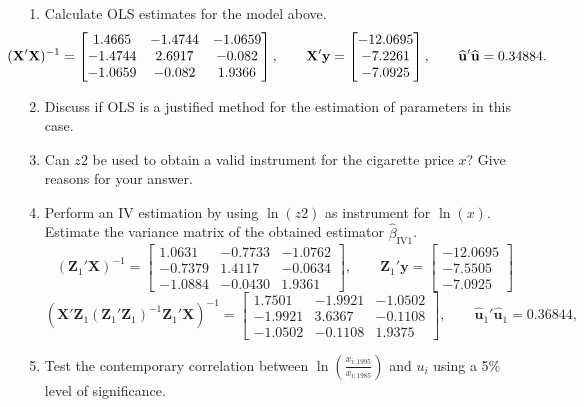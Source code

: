 \documentclass[captions=tableheading, 12pt, headings=small, parskip=half]{scrartcl}
\begin{document}
\begin{enumerate}[label = \alph*)]
	\item Calculate OLS estimates for the model above.
	\[\hspace{-1cm}
		(\mathbf{X}'\mathbf{X})^{-1}=%
		\begin{bmatrix}
		1.4665 & -1.4744 & -1.0659 \\ 
		-1.4744 & 2.6917 & -0.082 \\ 
		-1.0659 & -0.082 & 1.9366%
		\end{bmatrix}%
		,\qquad \mathbf{X}'\mathbf{y}=%
		\begin{bmatrix}
		-12.0695 \\ 
		-7.2261 \\ 
		-7.0925%
		\end{bmatrix}%
		,\qquad \widehat{\mathbf{u}}'\widehat{\mathbf{u}}=0.34884.
	\]
	\item Discuss if OLS is a justified method for the estimation of parameters in this case.
	\item Can $z2$ be used to obtain a valid instrument for the cigarette price $x$? Give reasons for your answer.
	\item Perform an IV estimation by using $\ln(z2)$ as instrument for $\ln(x)$. Estimate the variance matrix of the obtained estimator $\hat{\beta}_{\text{IV}1}$.
	\[
		(\mathbf{Z}_1'\mathbf{X})^{-1}=%
		\begin{bmatrix}
		1.0631 & -0.7733 & -1.0762 \\ 
		-0.7379 & 1.4117 & -0.0634 \\ 
		-1.0884 & -0.0430 & 1.9361%
		\end{bmatrix}%
		,\qquad \mathbf{Z}_1'\mathbf{y}=%
		\begin{bmatrix}
		-12.0695 \\ 
		-7.5505 \\ 
		-7.0925%
		\end{bmatrix}%
	\]
	\[
	(\mathbf{X}'%
	\mathbf{Z}_1(\mathbf{Z}_1'\mathbf{Z}_1)^{-1}\mathbf{Z%
	}_1'\mathbf{X})^{-1}=%
	\begin{bmatrix}
	1.7501 & -1.9921 & -1.0502 \\ 
	-1.9921 & 3.6367 & -0.1108 \\ 
	-1.0502 & -0.1108 & 1.9375%
	\end{bmatrix}%
	,\qquad \widehat{\mathbf{u}}_1'\widehat{\mathbf{u}}_1=0.36844,
	\]
	\item Test the contemporary correlation between $\ln\left(\frac{x_{i;1995}}{x_{i;1985}}\right)$ and $u_i$ using a 5\% level of significance.

\end{enumerate}
\end{document}
